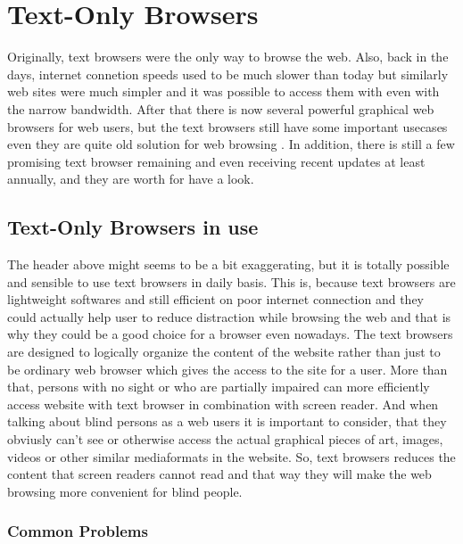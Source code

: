 %
%
% 
% 


\chapter{Text-Only Browsers}
\label{chap:tb}

Originally, text browsers were the only way to browse the web. Also,
back in the days, internet connetion speeds used to be much slower
than today but similarly web sites were much simpler and it was
possible to access them with even with the narrow bandwidth. After
that there is now several powerful graphical web browsers for web
users, but the text browsers still have some important usecases even
they are quite old solution for web browsing
\parencite{best-text-browsers}. In addition, there is still a few
promising text browser remaining and even receiving recent updates at
least annually, and they are worth for have a look.


\section{Text-Only Browsers in use}
\label{tb-known}
The header above might seems to be a bit exaggerating, but it is totally possible and sensible to use text browsers in daily basis. This is, because text browsers are lightweight softwares and still efficient on poor internet connection and they could actually help user to reduce distraction while browsing the web and that is why they could be a good choice for a browser even nowadays. The text browsers are designed to logically organize the content of the website rather than just to be ordinary web browser which gives the access to the site for a user. More than that, persons with no sight or who are partially impaired can more efficiently access website with text browser in combination with screen reader. And when talking about blind persons as a web users it is important to consider, that they obviusly can't see or otherwise access the actual graphical pieces of art, images, videos or other similar mediaformats in the website. \parencite[Chapter 2]{webbie} So, text browsers reduces the content that screen readers cannot read and that way they will make the web browsing more convenient for blind people.

\subsection{Common Problems}
\label{tb-problems}

